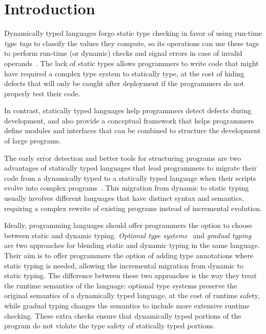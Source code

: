 \documentclass[preprint]{sigplanconf}
\begin{document}
\section{Introduction}
\label{sec:intro}

Dynamically typed languages forgo static type checking
in favor of using run-time {\em type tags} to classify
the values they compute, so its operations can use these
tags to perform run-time (or dynamic) checks and signal
errors in case of invalid operands~\cite{pierce2002tpl}.
The lack of static types allows programmers to write code
that might have required a complex type system to statically
type, at the cost of hiding defects that will only be caught
after deployment if the programmers do not properly
test their code.

In contrast, statically typed languages help programmers
detect defects during development, and also provide
a conceptual framework that helps programmers define modules
and interfaces that can be combined to structure the development
of large programs.

The early error detection and better tools for structuring
programs are two advantages of statically typed languages that
lead programmers to migrate their code from a dynamically
typed to a statically typed language when their scripts
evolve into complex programs~\cite{tobin-hochstadt2006ims}.
This migration from dynamic to static typing usually involves
different languages that have distinct syntax and semantics,
requiring a complex rewrite of existing programs instead of
incremental evolution.

Ideally, programming languages should offer programmers the
option to choose between static and dynamic typing.
\emph{Optional type systems}~\cite{bracha2004pluggable} and
\emph{gradual typing}~\cite{siek2006gradual} are two 
approaches for blending static and dynamic typing in the same
language. Their aim is to offer programmers the option
of adding type annotations where static typing is needed,
allowing the incremental migration from dynamic to static
typing. The difference between these two approaches is the
way they treat the runtime semantics of the language:
optional type systems preserve the original semantics
of a dynamically typed language, at the cost of runtime
safety, while gradual typing changes the semantics to
include more extensive runtime checking. These extra checks
ensure that
dynamically typed portions of the program do not violate
the type safety of statically typed portions.
\end{document}
